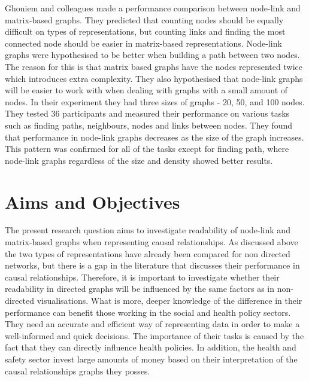 \documentclass{l4proj}
\begin{document}
Ghoniem and colleagues \cite{ghoniem2004comparison} made a performance comparison between node-link and matrix-based graphs. They predicted that counting nodes should be equally difficult on types of representations, but counting links and finding the most connected node should be easier in matrix-based representations. Node-link graphs were hypothesised to be better when building a path between two nodes. The reason for this is that matrix based graphs have the nodes represented twice which introduces extra complexity. They also hypothesised that node-link graphs will be easier to work with when dealing with graphs with a small amount of nodes. In their experiment they had three sizes of graphs - 20, 50, and 100 nodes. They tested 36 participants and measured their performance on various tasks such as finding paths, neighbours, nodes and links between nodes. They found that performance in node-link graphs decreases as the size of the graph increases. This pattern was confirmed for all of the tasks except for finding path, where node-link graphs regardless of the size and density showed better results.

\section{Aims and Objectives}

The present research question aims to investigate readability of node-link and matrix-based graphs when representing causal relationships. As discussed above the two types of representations have already been compared for non directed networks, but there is a gap in the literature that discusses their performance in causal relationships. Therefore, it is important to investigate whether their readability in directed graphs will be influenced by the same factors as in non-directed visualisations. What is more, deeper knowledge of the difference in their performance can benefit those working in the social and health policy sectors. They need an accurate and efficient way of representing data in order to make a well-informed and quick decisions. The importance of their tasks is caused by the fact that they can directly influence health policies. In addition, the health and safety sector invest large amounts of money based on their interpretation of the causal relationships graphs they posses.
\end{document}
